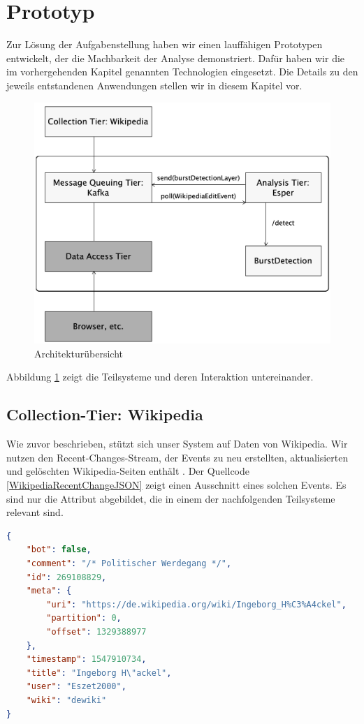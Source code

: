 \section{Prototyp}\label{section:prototyp}
Zur Lösung der Aufgabenstellung haben wir einen lauffähigen Prototypen entwickelt, der die Machbarkeit der Analyse demonstriert.
Dafür haben wir die im vorhergehenden Kapitel genannten Technologien eingesetzt. Die Details zu den jeweils entstandenen
Anwendungen stellen wir in diesem Kapitel vor.

\begin{figure}[h]
    \includegraphics[width=.5\textwidth]{images/Architektur_Uebersicht.png}
    \caption{Architekturübersicht}
    \label{fig:architektur_uebersicht}
\end{figure}

Abbildung \ref{fig:architektur_uebersicht} zeigt die Teilsysteme und deren Interaktion untereinander.


\subsection{Collection-Tier: Wikipedia}
Wie zuvor beschrieben, stützt sich unser System auf Daten von Wikipedia. Wir nutzen den Recent-Changes-Stream, der
Events zu neu erstellten, aktualisierten und gelöschten Wikipedia-Seiten enthält \cite{WikimediaManual}.
Der Quellcode \ref{WikipediaRecentChangeJSON} zeigt einen Ausschnitt eines solchen Events.
Es sind nur die Attribut abgebildet, die in einem der nachfolgenden Teilsysteme relevant sind.

\begin{lstlisting}[label=WikipediaRecentChangeJSON,caption=Wikipedia Recent-Change-Event,language=json,firstnumber=1,captionpos=b]
{
    "bot": false,
    "comment": "/* Politischer Werdegang */",
    "id": 269108829,
    "meta": {
        "uri": "https://de.wikipedia.org/wiki/Ingeborg_H%C3%A4ckel",
        "partition": 0,
        "offset": 1329388977
    },
    "timestamp": 1547910734,
    "title": "Ingeborg H\"ackel",
    "user": "Eszet2000",
    "wiki": "dewiki"
}
\end{lstlisting}

